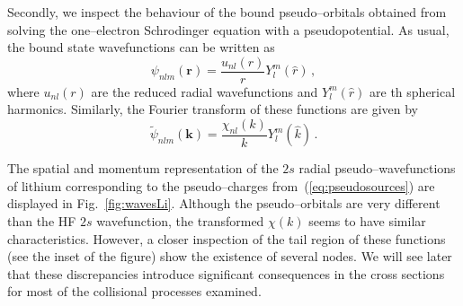 \documentclass[10pt]{article}
\begin{document}
Secondly, we inspect the behaviour of the bound pseudo--orbitals 
obtained from solving the one--electron Schrodinger equation with a 
pseudopotential. As usual, the bound state wavefunctions can be 
written as
\begin{equation}
 \psi_{nlm}(\mathbf{r}) = \frac{u_{nl}(r)}{r}Y_l^m(\hat{r})\,,
 \label{eq:centralfield-wave}
\end{equation}
where $u_{nl}(r)$ are the reduced radial wavefunctions and $Y_l^m(\hat{r})$ are
th spherical harmonics. Similarly, the Fourier transform of these
functions are given by
\begin{equation}
 \widetilde{\psi}_{nlm}(\mathbf{k}) =
 \frac{\chi_{nl}(k)}{k}Y_l^m(\hat{k})\,.
\end{equation}

The spatial and momentum representation of the $2s$ radial 
pseudo--wavefunctions of lithium corresponding to the pseudo--charges 
from~(\ref{eq:pseudosources}) are displayed in Fig.~\ref{fig:wavesLi}.
Although the pseudo--orbitals are very different
than the HF $2s$ wavefunction, the transformed $\chi(k)$ seems to 
have similar characteristics. However, a closer inspection of the 
tail region of these functions (see the inset of the figure) 
show the existence of several nodes.
We will see later that these discrepancies introduce significant 
consequences in the cross sections for most of the collisional 
processes examined.
\end{document}
